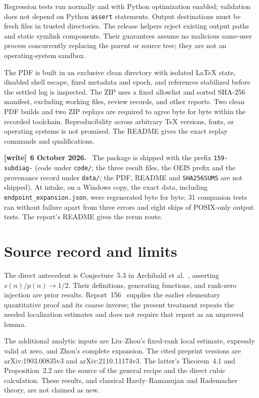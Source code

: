 \documentclass[11pt,letterpaper]{article}
\numberwithin{equation}{section}
\theoremstyle{remark}\newtheorem{remark}[theorem]{Remark}
\newcommand{\file}[1]{\nolinkurl{#1}}
\newenvironment{writenote}[1][]{\par\smallskip\begingroup\small
 \noindent\textbf{[write]}\if\relax\detokenize{#1}\relax\else~\textbf{#1.}\fi\ }%
 {\par\endgroup\smallskip}
\begin{document}
Regression tests run normally and with Python optimization enabled;
validation does not depend on Python \texttt{assert} statements.
Output destinations must be fresh files in trusted directories.
The release helpers reject existing output paths and static symlink
components. Their guarantees assume no malicious same-user process
concurrently replacing the parent or source tree; they are not an
operating-system sandbox.

The PDF is built in an exclusive clean directory with isolated
LaTeX state, disabled shell escape, fixed metadata and epoch, and
references stabilized before the settled log is inspected. The ZIP
uses a fixed allowlist and sorted SHA-256 manifest, excluding
working files, review records, and other reports. Two clean PDF
builds and two ZIP replays are required to agree byte for byte
within the recorded toolchain. Reproducibility across arbitrary
TeX versions, fonts, or operating systems is not promised. The
README gives the exact replay commands and qualifications.
\begin{writenote}[6 October 2026]
The package is shipped with the prefix \file{159-subdiag-} (code under \file{code/}; the three result files, the OEIS prefix and the provenance record under \file{data/}; the PDF, README and \file{SHA256SUMS} are not shipped). At intake, on a Windows copy, the exact data, including \file{endpoint_expansion.json}, were regenerated byte for byte; 31 companion tests ran without failure apart from three errors and eight skips of POSIX-only output tests. The report's README gives the rerun route.
\end{writenote}

\section{Source record and limits}\label{dgp:sub:sec:sources}
The direct antecedent is Conjecture~5.3 in Archibald et
al.~\cite{abek}, asserting $s(n)/p(n)\to1/2$. Their definitions,
generating functions, and rank-zero injection are prior results.
Report~156~\cite{r156} supplies the earlier elementary quantitative
proof and its coarse inverse; the present treatment repeats the
needed localization estimates and does not require that report as
an unproved lemma.

The additional analytic inputs are Liu--Zhou's fixed-rank local
estimate, expressly valid at zero, and Zhou's complete expansion.
The cited preprint versions are arXiv:1903.00835v3 and
arXiv:2110.11174v3. The latter's Theorem~4.1 and Proposition~2.2
are the source of the general recipe and the direct cubic
calculation. These results, and classical Hardy--Ramanujan and
Rademacher theory, are not claimed as new.
\end{document}
